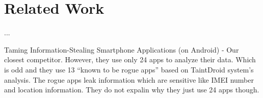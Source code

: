 \section{Related Work}
...

Taming Information-Stealing Smartphone Applications (on Android) - Our closest competitor. However, they use only 24 apps to analyze their data. Which is odd and they use 13 ``known to be rogue apps'' based on TaintDroid system's analysis. The rogue apps leak information which are sensitive like IMEI number and location information. They do not expalin why they just use 24 apps though.
